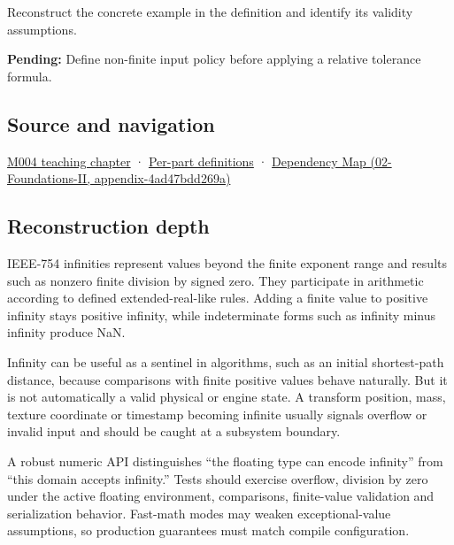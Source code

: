 Reconstruct the concrete example in the definition and identify its validity assumptions.

\textbf{Pending:} Define non-finite input policy before applying a relative tolerance formula.

\subsection{Source and navigation}\label{appendix-eb336149c00a-source-and-navigation}

\hyperref[01-foundations-i-ch001-a-stretching-ruler-for-real-valued-quantities]{M004 teaching chapter} · \hyperref[appendix-fd090d982a15-m004---parts-61-76]{Per-part definitions} · \href{../02-Foundations-II/main.pdf\#nameddest=appendix-4ad47bdd269a}{Dependency Map (02-Foundations-II, appendix-4ad47bdd269a)}

\subsection{Reconstruction depth}\label{appendix-eb336149c00a-reconstruction-depth}

IEEE-754 infinities represent values beyond the finite exponent range and results such as nonzero finite division by signed zero. They participate in arithmetic according to defined extended-real-like rules. Adding a finite value to positive infinity stays positive infinity, while indeterminate forms such as infinity minus infinity produce NaN.

Infinity can be useful as a sentinel in algorithms, such as an initial shortest-path distance, because comparisons with finite positive values behave naturally. But it is not automatically a valid physical or engine state. A transform position, mass, texture coordinate or timestamp becoming infinite usually signals overflow or invalid input and should be caught at a subsystem boundary.

A robust numeric API distinguishes ``the floating type can encode infinity'' from ``this domain accepts infinity.'' Tests should exercise overflow, division by zero under the active floating environment, comparisons, finite-value validation and serialization behavior. Fast-math modes may weaken exceptional-value assumptions, so production guarantees must match compile configuration.
